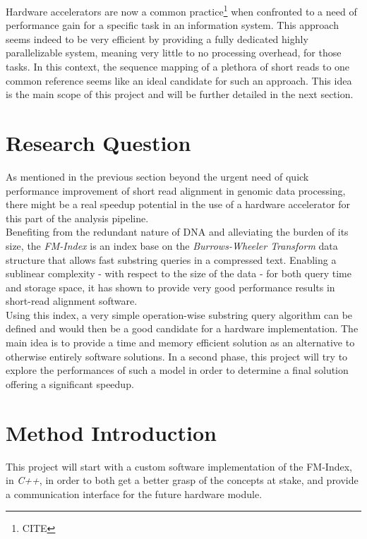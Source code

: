 Hardware accelerators are now a common practice\footnote{CITE} when confronted to a need of performance gain for a specific task in an information system. This approach seems indeed to be very efficient by providing a fully dedicated highly parallelizable system, meaning very little to no processing overhead, for those tasks. In this context, the sequence mapping of a plethora of short reads to one common reference seems like an ideal candidate for such an approach. This idea is the main scope of this project and will be further detailed in the next section.

\section{Research Question}

As mentioned in the previous section beyond the urgent need of quick performance improvement of short read alignment in genomic data processing, there might be a real speedup potential in the use of a hardware accelerator for this part of the analysis pipeline. \\

Benefiting from the redundant nature of DNA and alleviating the burden of its size, the \textsl{FM-Index} is an index base on the \textsl{Burrows-Wheeler Transform} data structure that allows fast substring queries in a compressed text. Enabling a sublinear complexity - with respect to the size of the data - for both query time and storage space, it has shown to provide very good performance results in short-read alignment software. \\

Using this index, a very simple operation-wise substring query algorithm can be defined and would then be a good candidate for a hardware implementation. The main idea is to provide a time and memory efficient solution as an alternative to otherwise entirely software solutions. In a second phase, this project will try to explore the performances of such a model in order to determine a final solution offering a significant speedup.

\section{Method Introduction}

This project will start with a custom software implementation of the FM-Index, in \textsl{C++}, in order to both get a better grasp of the concepts at stake, and provide a communication interface for the future hardware module.

